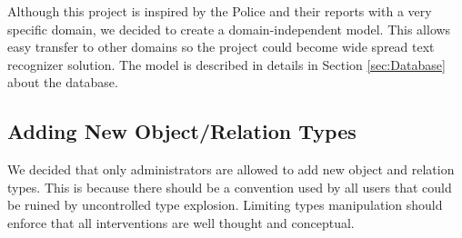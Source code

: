 Although this project is inspired by the Police and their reports with a
very specific domain, we decided to create a domain-independent model. This
allows easy transfer to other domains so the project could become wide spread
text recognizer solution. The model is described in details in Section
\ref{sec:Database} about the database.

\subsection{Adding New Object/Relation Types}
\label{ssec:AddingTypes}

We decided that only administrators are allowed to add new object and relation
types. This is because there should be a convention used by all users that could
be ruined by uncontrolled type explosion. Limiting types manipulation should
enforce that all interventions are well thought and conceptual.

